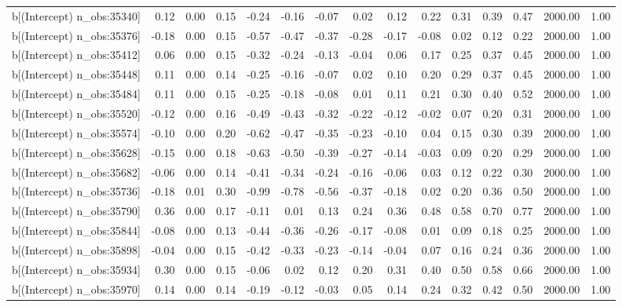 \begin{table}[ht]
\begin{tabular}{rrrrrrrrrrrrrrr}
  b[(Intercept) n\_obs:35340] & 0.12 & 0.00 & 0.15 & -0.24 & -0.16 & -0.07 & 0.02 & 0.12 & 0.22 & 0.31 & 0.39 & 0.47 & 2000.00 & 1.00 \\ 
  b[(Intercept) n\_obs:35376] & -0.18 & 0.00 & 0.15 & -0.57 & -0.47 & -0.37 & -0.28 & -0.17 & -0.08 & 0.02 & 0.12 & 0.22 & 2000.00 & 1.00 \\ 
  b[(Intercept) n\_obs:35412] & 0.06 & 0.00 & 0.15 & -0.32 & -0.24 & -0.13 & -0.04 & 0.06 & 0.17 & 0.25 & 0.37 & 0.45 & 2000.00 & 1.00 \\ 
  b[(Intercept) n\_obs:35448] & 0.11 & 0.00 & 0.14 & -0.25 & -0.16 & -0.07 & 0.02 & 0.10 & 0.20 & 0.29 & 0.37 & 0.45 & 2000.00 & 1.00 \\ 
  b[(Intercept) n\_obs:35484] & 0.11 & 0.00 & 0.15 & -0.25 & -0.18 & -0.08 & 0.01 & 0.11 & 0.21 & 0.30 & 0.40 & 0.52 & 2000.00 & 1.00 \\ 
  b[(Intercept) n\_obs:35520] & -0.12 & 0.00 & 0.16 & -0.49 & -0.43 & -0.32 & -0.22 & -0.12 & -0.02 & 0.07 & 0.20 & 0.31 & 2000.00 & 1.00 \\ 
  b[(Intercept) n\_obs:35574] & -0.10 & 0.00 & 0.20 & -0.62 & -0.47 & -0.35 & -0.23 & -0.10 & 0.04 & 0.15 & 0.30 & 0.39 & 2000.00 & 1.00 \\ 
  b[(Intercept) n\_obs:35628] & -0.15 & 0.00 & 0.18 & -0.63 & -0.50 & -0.39 & -0.27 & -0.14 & -0.03 & 0.09 & 0.20 & 0.29 & 2000.00 & 1.00 \\ 
  b[(Intercept) n\_obs:35682] & -0.06 & 0.00 & 0.14 & -0.41 & -0.34 & -0.24 & -0.16 & -0.06 & 0.03 & 0.12 & 0.22 & 0.30 & 2000.00 & 1.00 \\ 
  b[(Intercept) n\_obs:35736] & -0.18 & 0.01 & 0.30 & -0.99 & -0.78 & -0.56 & -0.37 & -0.18 & 0.02 & 0.20 & 0.36 & 0.50 & 2000.00 & 1.00 \\ 
  b[(Intercept) n\_obs:35790] & 0.36 & 0.00 & 0.17 & -0.11 & 0.01 & 0.13 & 0.24 & 0.36 & 0.48 & 0.58 & 0.70 & 0.77 & 2000.00 & 1.00 \\ 
  b[(Intercept) n\_obs:35844] & -0.08 & 0.00 & 0.13 & -0.44 & -0.36 & -0.26 & -0.17 & -0.08 & 0.01 & 0.09 & 0.18 & 0.25 & 2000.00 & 1.00 \\ 
  b[(Intercept) n\_obs:35898] & -0.04 & 0.00 & 0.15 & -0.42 & -0.33 & -0.23 & -0.14 & -0.04 & 0.07 & 0.16 & 0.24 & 0.36 & 2000.00 & 1.00 \\ 
  b[(Intercept) n\_obs:35934] & 0.30 & 0.00 & 0.15 & -0.06 & 0.02 & 0.12 & 0.20 & 0.31 & 0.40 & 0.50 & 0.58 & 0.66 & 2000.00 & 1.00 \\ 
  b[(Intercept) n\_obs:35970] & 0.14 & 0.00 & 0.14 & -0.19 & -0.12 & -0.03 & 0.05 & 0.14 & 0.24 & 0.32 & 0.42 & 0.50 & 2000.00 & 1.00 \\ 

\end{tabular}
\end{table}
